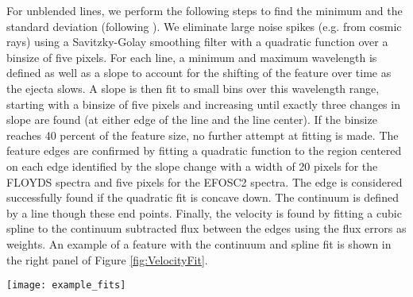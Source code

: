 \documentclass[a4paper,fleqn,usenatbib]{mnras}
\begin{document}
For unblended lines, we perform the following steps to find the minimum and the standard deviation (following \citealt{2012silverman}).
We eliminate large noise spikes (e.g. from cosmic rays) using a Savitzky-Golay smoothing filter \citep{1964savitzky} with a quadratic function over a binsize of five pixels. 
For each line, a minimum and maximum wavelength is defined as well as a slope to account for the shifting of the feature over time as the ejecta slows. 
A slope is then fit to small bins over this wavelength range, starting with a binsize of five pixels and increasing until exactly three changes in slope are found (at either edge of the line and the line center). 
If the binsize reaches 40 percent of the feature size, no further attempt at fitting is made. 
The feature edges are confirmed by fitting a quadratic function to the region centered on each edge identified by the slope change with a width of 20 pixels for the FLOYDS spectra and five pixels for the EFOSC2 spectra. 
The edge is considered successfully found if the quadratic fit is concave down. 
The continuum is defined by a line though these end points.
Finally, the velocity is found by fitting a cubic spline to the continuum subtracted flux between the edges using the flux errors as weights. 
An example of a feature with the continuum and spline fit is shown in the right panel of Figure \ref{fig:VelocityFit}.
\begin{figure*}
\begin{center}
\texttt{[image: example\_fits]}
\caption{An example of a fit to the multi-component Ca II NIR triplet (left) using multiple Gaussians and a single line fit (following \citealt{2012silverman}, right) to the Sc II ($\rm{\lambda}$5662) line.
The observed spectrum is plotted in black.
The continuum edges are marked with a cyan circle and the cyan dashed line connecting these points is used as the continuum. 
The Ca II NIR triplet fit is found by simultaneously fitting three Gaussians with the same standard deviation and mean offsets corresponding to the expected wavelength separation of the triplet. 
The individual Gaussians are plotting at as dotted lines and the combined fit is plotted as a solid green line. 
The minima of the individual Gaussians is used to find the velocity of each component.
The Sc II feature is fit with a cubic spline. 
The minimum of the spline is used to find the Sc II velocity.
\label{fig:VelocityFit}}
\end{center}
\end{figure*}
\end{document}
